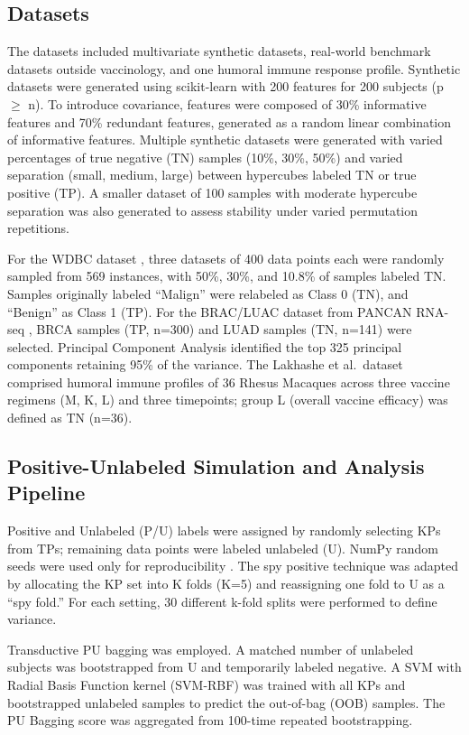 \documentclass[11pt]{article}
\begin{document}
\subsection{Datasets}
The datasets included multivariate synthetic datasets, real-world benchmark datasets outside vaccinology, and one humoral immune response profile. Synthetic datasets were generated using scikit-learn \cite{pedregosa2011scikit} with 200 features for 200 subjects (p $\geq$ n). To introduce covariance, features were composed of 30\% informative features and 70\% redundant features, generated as a random linear combination of informative features. Multiple synthetic datasets were generated with varied percentages of true negative (TN) samples (10\%, 30\%, 50\%) and varied separation (small, medium, large) between hypercubes labeled TN or true positive (TP). A smaller dataset of 100 samples with moderate hypercube separation was also generated to assess stability under varied permutation repetitions.

For the WDBC dataset \cite{street1993wdbc}, three datasets of 400 data points each were randomly sampled from 569 instances, with 50\%, 30\%, and 10.8\% of samples labeled TN. Samples originally labeled ``Malign'' were relabeled as Class 0 (TN), and ``Benign'' as Class 1 (TP). For the BRAC/LUAC dataset from PANCAN RNA-seq \cite{weinstein2013pancan}, BRCA samples (TP, n=300) and LUAD samples (TN, n=141) were selected. Principal Component Analysis identified the top 325 principal components retaining 95\% of the variance. The Lakhashe et al.\ dataset \cite{lakhashe2019humoral} comprised humoral immune profiles of 36 Rhesus Macaques across three vaccine regimens (M, K, L) and three timepoints; group L (overall vaccine efficacy) was defined as TN (n=36).

\subsection{Positive-Unlabeled Simulation and Analysis Pipeline}
Positive and Unlabeled (P/U) labels were assigned by randomly selecting KPs from TPs; remaining data points were labeled unlabeled (U). NumPy random seeds were used only for reproducibility \cite{harris2020numpy}. The spy positive technique was adapted by allocating the KP set into K folds (K=5) and reassigning one fold to U as a ``spy fold.'' For each setting, 30 different k-fold splits were performed to define variance.

Transductive PU bagging \cite{mordelet2014bagging} was employed. A matched number of unlabeled subjects was bootstrapped from U and temporarily labeled negative. A SVM with Radial Basis Function kernel (SVM-RBF) \cite{pedregosa2011scikit} was trained with all KPs and bootstrapped unlabeled samples to predict the out-of-bag (OOB) samples. The PU Bagging score was aggregated from 100-time repeated bootstrapping.
\end{document}

